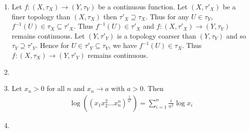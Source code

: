 \documentclass[a4paper,12pt]{article}
\theoremstyle{definition}
\begin{document}
\begin{enumerate}
\item Let $f : (X, \tau_X) \to (Y, \tau_Y)$ be a continuous function. Let $(X,\tau'_X)$ be a finer topology than $(X, \tau_X)$ then $\tau'_X \supseteq \tau_X$. Thus for any $U \in \tau_Y$, $f^{-1}(U) \in \tau_X \subseteq \tau'_X$. Thus $f^{-1}(U) \in \tau'_X$ and $f : (X, \tau'_X) \to (Y, \tau_Y)$ remains continuous. Let $(Y,\tau'_Y)$ is a topology coarser than $(Y, \tau_Y)$ and so $\tau_Y \supseteq\tau'_Y$. Hence for $U \in \tau'_Y \subseteq \tau_Y$, we have $f^{-1}(U)\in \tau_X$. Thus  $f : (X, \tau_X) \to (Y, \tau'_Y)$ remains continuous.

\item

\item Let $x_n >0$ for all $n$ and $x_n \to a$ with $a >0$. Then
\begin{align*}
\log \left((x_1x_2^2 \ldots x_n^n)^{\frac{1}{n^2}}\right) = \sum_{i=1}^{n}\frac{i}{n^2}\log x_i
\end{align*}

\item
\end{enumerate}
\end{document}
